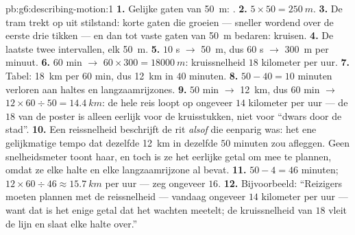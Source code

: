 \begin{solution}{pb:g6:describing-motion:1}
\textbf{1.} Gelijke gaten van \qty{50}{m}: .
\textbf{2.} $5 \times 50 = \qty{250}{m}$.
\textbf{3.} De tram trekt op uit stilstand: korte gaten die groeien
--- sneller wordend over de eerste drie tikken --- en dan tot vaste
gaten van \qty{50}{m} bedaren: kruisen.
\textbf{4.} De laatste twee intervallen, elk \qty{50}{m}.
\textbf{5.} $10$ s $\to$ \qty{50}{m}, dus $60$ s $\to$ \qty{300}{m}
per minuut.
\textbf{6.} $60$ min $\to$ $60 \times 300 = \qty{18000}{m}$:
kruissnelheid $18$ kilometer per uur.
\textbf{7.} Tabel: \qty{18}{km} per $60$ min, dus \qty{12}{km} in
$40$ minuten.
\textbf{8.} $50 - 40 = 10$ minuten verloren aan haltes en
langzaamrijzones.
\textbf{9.} $50$ min $\to$ \qty{12}{km}, dus $60$ min $\to$
$12 \times 60 \div 50 = \qty{14.4}{km}$: de hele reis loopt op
ongeveer $14$ kilometer per uur --- de $18$ van de poster is alleen
eerlijk voor de kruisstukken, niet voor ``dwars door de stad''.
\textbf{10.} Een reissnelheid beschrijft de rit \emph{alsof} die
eenparig was: het ene gelijkmatige tempo dat dezelfde \qty{12}{km} in
dezelfde $50$ minuten zou afleggen. Geen snelheidsmeter toont haar, en
toch is ze het eerlijke getal om mee te plannen, omdat ze elke halte
en elke langzaamrijzone al bevat.
\textbf{11.} $50 - 4 = 46$ minuten;
$12 \times 60 \div 46 \approx \qty{15.7}{km}$ per uur --- zeg
ongeveer $16$.
\textbf{12.} Bijvoorbeeld: ``Reizigers moeten plannen met de
reissnelheid --- vandaag ongeveer $14$ kilometer per uur --- want dat
is het enige getal dat het wachten meetelt; de kruissnelheid van $18$
vleit de lijn en slaat elke halte over.''
\end{solution}
